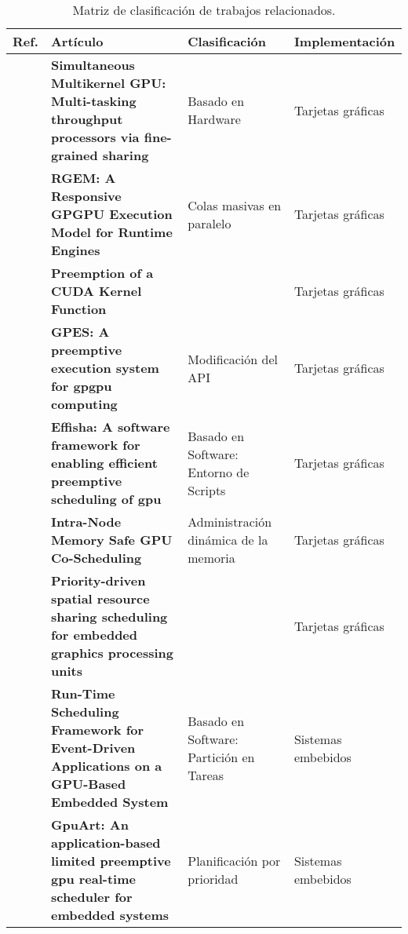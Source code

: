   \begin{table}[h!]
      \begin{center}
            \scriptsize
        \begin{tabular}{|m{1cm}|m{6cm}|m{3cm}|m{3cm}|}
         \hline
        \cellcolor{lightgray}\textbf{Ref.} & \cellcolor{lightgray} \textbf{Artículo} & \cellcolor{lightgray} \textbf{Clasificación} & \cellcolor{lightgray} \textbf{Implementación}  \\ 
         \hline
          \textbf{\cite{20}} & \textbf{Simultaneous Multikernel GPU: Multi-tasking throughput processors via fine-grained sharing} &  Basado en Hardware& Tarjetas gráficas\\
           \hline
          \textbf{\cite{RGEM}} & \textbf{RGEM: A Responsive GPGPU Execution Model for Runtime Engines} & Colas masivas en paralelo & Tarjetas gráficas\\
           \hline
           \textbf{\cite{PreeK}} & \textbf{Preemption of a CUDA Kernel Function} &  & Tarjetas gráficas\\
            \hline
            \textbf{\cite{GPES}} & \textbf{GPES: A preemptive execution system for gpgpu computing} & Modificación del API  & Tarjetas gráficas\\
           \hline
            \textbf{\cite{Effisha}} & \textbf{Effisha: A software framework for enabling efficient preemptive scheduling of gpu} & Basado en Software: Entorno de Scripts  & Tarjetas gráficas\\
          \hline
           \textbf{\cite{IntraNode}} & \textbf{Intra-Node Memory Safe GPU Co-Scheduling} & Administración dinámica de la memoria & Tarjetas gráficas\\
            \hline
             \textbf{\cite{Pridriven}} & \textbf{Priority-driven spatial resource sharing scheduling for embedded graphics processing units} &   & Tarjetas gráficas\\
            \hline
             \textbf{\cite{RTFG}} & \textbf{Run-Time Scheduling Framework for Event-Driven Applications on a GPU-Based Embedded System} & Basado en Software: Partición en Tareas & Sistemas embebidos\\
            \hline
            \textbf{\cite{GPUArt}} & \textbf{GpuArt: An application-based limited preemptive gpu real-time scheduler for embedded systems} & Planificación por prioridad & Sistemas embebidos\\
            \hline
                \end{tabular}
        \caption{Matriz de clasificación de trabajos relacionados.}
        \label{tab:table2}
      \end{center}
    \end{table}


